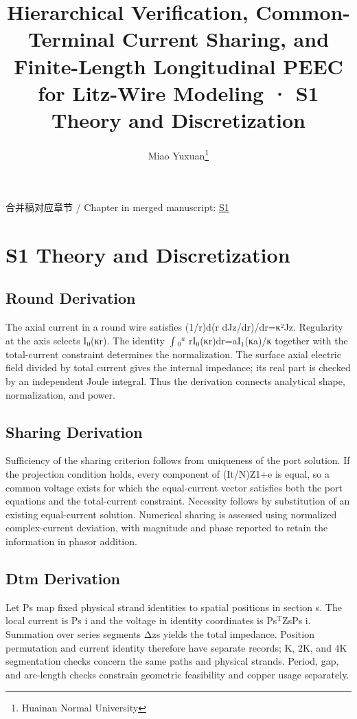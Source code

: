 \documentclass[journal,10pt]{IEEEtran}
\begin{document}
\title{Hierarchical Verification, Common-Terminal Current Sharing, and Finite-Length Longitudinal PEEC for Litz-Wire Modeling · S1 Theory and Discretization}
\author{Miao Yuxuan\thanks{Huainan Normal University}}

\maketitle
\noindent 合并稿对应章节 / Chapter in merged manuscript: \href{paper_en_ieee.pdf#chapter-S1}{S1}\par
\FloatBarrier
\section*{S1 Theory and Discretization}
\hypertarget{chapter-S1}{}
\subsection*{Round Derivation}
\hypertarget{S1.round_derivation.heading}{}
The axial current in a round wire satisfies (1/r)d(r dJz/dr)/dr=κ²Jz. Regularity at the axis selects I\(_0\)(κr). The identity \(\int\)\(_0\)\(^a\) rI\(_0\)(κr)dr=aI\(_1\)(κa)/κ together with the total-current constraint determines the normalization. The surface axial electric field divided by total current gives the internal impedance; its real part is checked by an independent Joule integral. Thus the derivation connects analytical shape, normalization, and power.


\subsection*{Sharing Derivation}
\hypertarget{S1.sharing_derivation.heading}{}
Sufficiency of the sharing criterion follows from uniqueness of the port solution. If the projection condition holds, every component of (It/N)Z1+e is equal, so a common voltage exists for which the equal-current vector satisfies both the port equations and the total-current constraint. Necessity follows by substitution of an existing equal-current solution. Numerical sharing is assessed using normalized complex-current deviation, with magnitude and phase reported to retain the information in phasor addition.


\subsection*{Dtm Derivation}
\hypertarget{S1.dtm_derivation.heading}{}
Let Ps map fixed physical strand identities to spatial positions in section s. The local current is Ps i and the voltage in identity coordinates is Ps\(^{\mathrm T}\)ZsPs i. Summation over series segments Δzs yields the total impedance. Position permutation and current identity therefore have separate records; K, 2K, and 4K segmentation checks concern the same paths and physical strands. Period, gap, and arc-length checks constrain geometric feasibility and copper usage separately.
\end{document}

